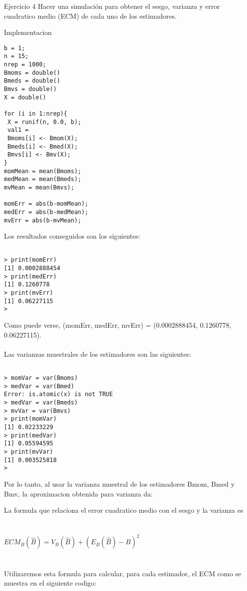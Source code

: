 



\begin{section}{Ejercicio 4}
Hacer una simulación para obtener el sesgo, varianza y error cuadratico medio (ECM) de
cada uno de los estimadores.

\begin{subsection}{Implementacion}



\begin{verbatim}
b = 1;
n = 15;
nrep = 1000;
Bmoms = double()
Bmeds = double()
Bmvs = double()
X = double()

for (i in 1:nrep){
 X = runif(n, 0.0, b);
 val1 = 
 Bmoms[i] <- Bmom(X);
 Bmeds[i] <- Bmed(X);
 Bmvs[i] <- Bmv(X);
}
momMean = mean(Bmoms);
medMean = mean(Bmeds);
mvMean = mean(Bmvs);

momErr = abs(b-momMean);
medErr = abs(b-medMean);
mvErr = abs(b-mvMean);

\end{verbatim}
Los resultados conseguidos son los siguientes:

\begin{verbatim}

> print(momErr)
[1] 0.0002888454
> print(medErr)
[1] 0.1260778
> print(mvErr)
[1] 0.06227115
> 
\end{verbatim}
Como puede verse, (momErr, medErr, mvErr) = (0.0002888454, 0.1260778, 0.06227115).\\
\\
Las varianzas muestrales de los estimadores son las siguientes:


\begin{verbatim}

> momVar = var(Bmoms)
> medVar = var(Bmed)
Error: is.atomic(x) is not TRUE
> medVar = var(Bmeds)
> mvVar = var(Bmvs)
> print(momVar)
[1] 0.02233229
> print(medVar)
[1] 0.05594595
> print(mvVar)
[1] 0.003525818
> 

\end{verbatim}

Por lo tanto, al usar la varianza muestral de los estimadores  Bmom, Bmed y Bmv, la aproximacion obtenida para varianza da: \\


La formula que relaciona el error cuadratico medio con el sesgo y la varianza es \\
~\\
~\\
$ECM_B(\hat{B}) = V_B(\hat{B}) + (E_B(\hat{B}) - B)^2$\\
~\\
~\\
Utilizaremos esta formula para calcular, para cada estimador, el ECM como se muestra en el siguiente codigo:


\end{subsection}
\end{section}
